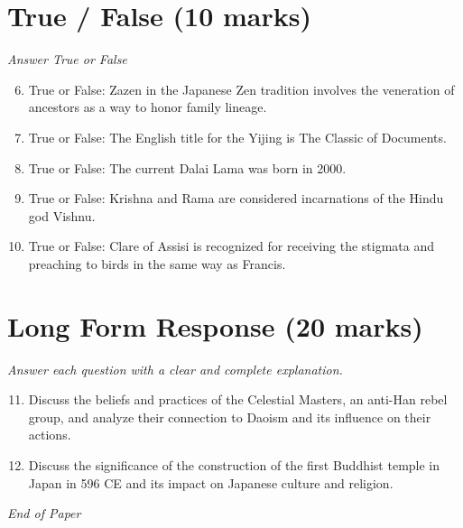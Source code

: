 \documentclass[12pt]{article}
\begin{document}
\section*{True / False (10 marks)}
\textit{Answer True or False}
\begin{enumerate}[label=\arabic*.]
\setcounter{enumi}{5}
\item True or False: Zazen in the Japanese Zen tradition involves the veneration of ancestors as a way to honor family lineage.
\item True or False: The English title for the Yijing is The Classic of Documents.
\item True or False: The current Dalai Lama was born in 2000.
\item True or False: Krishna and Rama are considered incarnations of the Hindu god Vishnu.
\item True or False: Clare of Assisi is recognized for receiving the stigmata and preaching to birds in the same way as Francis.
\end{enumerate}

\section*{Long Form Response (20 marks)}
\textit{Answer each question with a clear and complete explanation.}
\begin{enumerate}[label=\arabic*.]
\setcounter{enumi}{10}
\item Discuss the beliefs and practices of the Celestial Masters, an anti-Han rebel group, and analyze their connection to Daoism and its influence on their actions.
\item Discuss the significance of the construction of the first Buddhist temple in Japan in 596 CE and its impact on Japanese culture and religion.
\end{enumerate}

\vfill
\noindent\textit{End of Paper}
\end{document}
